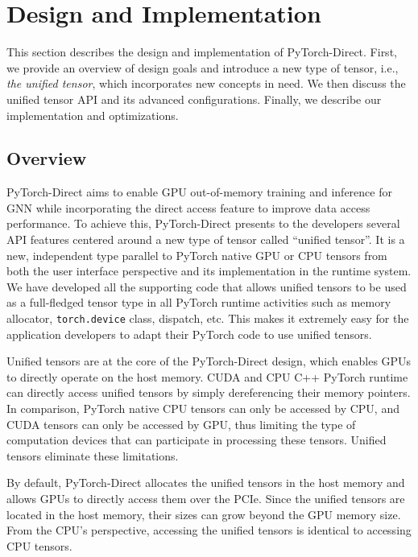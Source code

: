 \section{Design and Implementation}



 This section describes the design and implementation of PyTorch-Direct.
First, we provide an overview of design goals and introduce a new type of tensor, i.e., \textit{the unified tensor}, which incorporates new concepts in need.
We then discuss the unified tensor API and its advanced configurations.
Finally, we describe our implementation and optimizations.

\subsection{Overview}
\label{sec.PyTorch_direct.Overview}


PyTorch-Direct aims to enable GPU out-of-memory training and inference for GNN while incorporating the direct access feature to improve data access performance.
To achieve this, PyTorch-Direct presents to the developers several API features centered around a new type of tensor called ``unified tensor''.
It is a new, independent type parallel to PyTorch native GPU or CPU tensors from both the user interface perspective and its implementation in the runtime system. We have developed all the supporting code that allows unified tensors to be used as a full-fledged tensor type in all PyTorch runtime activities such as memory allocator, \texttt{torch.device} class, dispatch, etc. This makes it extremely easy for the application developers to adapt their PyTorch code to use unified tensors.


 
Unified tensors are at the core of the PyTorch-Direct design, which enables GPUs to directly operate on the host memory.
 CUDA and CPU C++  PyTorch runtime can directly access unified tensors by simply dereferencing their memory pointers.
In comparison, PyTorch native CPU tensors can only be accessed by CPU, and CUDA tensors can only be accessed by GPU, thus limiting the type of computation devices that can participate in processing these tensors.
Unified tensors eliminate these limitations.

By default, PyTorch-Direct allocates the unified tensors in the host memory and allows GPUs to directly access them over the PCIe.
Since the unified tensors are located in the host memory, their sizes can grow beyond the GPU memory size.
From the CPU's perspective, accessing the unified tensors is identical to accessing CPU tensors.

